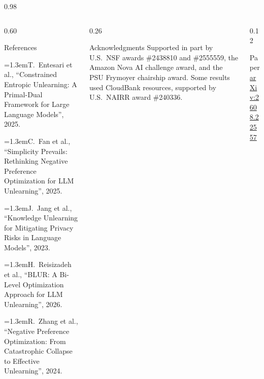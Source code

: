 \documentclass[final,svgnames,english]{beamer}
\begin{document}
\begin{frame}[t,fragile]{}
\begin{columns}[T]
\begin{column}{0.98\linewidth}
      \begin{columns}[T,onlytextwidth]
        \begin{column}{0.60\linewidth}
          \begin{plainblock}[before skip=0pt]{References}
            \fontsize{21pt}{25pt}\selectfont\raggedright\setlength{\multicolsep}{0pt}
            \newcommand{\refi}[4]{\hangindent=1.3em\hangafter=1\makebox[1.3em][l]{#1.}#2, \textcolor{psu-beaver}{``#3''}, #4.\par\vspace{0.15em}}
            \begin{minipage}[t]{0.49\linewidth}
                \refi{1}{T.~Entesari et al.}{Constrained Entropic Unlearning: A Primal-Dual Framework for Large Language Models}{2025}
                \refi{2}{C.~Fan et al.}{Simplicity Prevails: Rethinking Negative Preference Optimization for LLM Unlearning}{2025}
                \refi{3}{J.~Jang et al.}{Knowledge Unlearning for Mitigating Privacy Risks in Language Models}{2023}
            \end{minipage}\hfill
            \begin{minipage}[t]{0.49\linewidth}
                \refi{4}{H.~Reisizadeh et al.}{BLUR: A Bi-Level Optimization Approach for LLM Unlearning}{2026}
                \refi{5}{R.~Zhang et al.}{Negative Preference Optimization: From Catastrophic Collapse to Effective Unlearning}{2024}
            \end{minipage}
          \end{plainblock}
        \end{column}
        \begin{column}{0.26\linewidth}
          \begin{plainblock}[before skip=0pt]{Acknowledgments}
            \small
            Supported in part by U.S.\ NSF awards \#2438810 and \#2555559, the Amazon Nova AI challenge award,
            and the PSU Frymoyer chairship award. Some results used CloudBank resources, supported by
            U.S.\ NAIRR award \#240336.
          \end{plainblock}
        \end{column}
        \begin{column}{0.12\linewidth}
          \begin{plainblock}[before skip=0pt, halign=center]{Paper}
            \\[0.3ex]
            {\footnotesize\href{https://arxiv.org/abs/2608.22557}{arXiv:2608.22557}}
          \end{plainblock}
        \end{column}
      \end{columns}
    \end{column}


\end{columns}
\end{frame}
\end{document}
